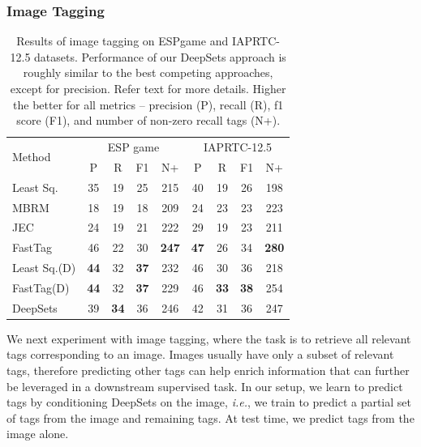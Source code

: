 \documentclass{article}
\newcommand{\latinphrase}[1]{\emph{#1}}    %
\newcommand{\ie}{\latinphrase{i.e.}\xspace}
\newcommand{\deepsets}{DeepSets\xspace}
\begin{document}
\subsubsection{Image Tagging}
\label{sec:image-tag}
\begin{table}
\vspace{-5mm}
    \setlength{\tabcolsep}{4pt}
    \centering
    \scalebox{.75} {
    \begin{tabular}{l | cccc | cccc}
    \toprule
    \multirow{2}{*}{Method} 
    & \multicolumn{4}{c|}{ESP game} 
    & \multicolumn{4}{c}{IAPRTC-12.5}\\
    
    & P & R & F1 & N+
    & P & R & F1 & N+\\
    \midrule
        
     Least Sq. & 35 & 19 & 25 & 215 
        & 40 & 19 & 26 & 198 \\
    
    MBRM & 18 & 19 & 18 & 209
        & 24 & 23 & 23 & 223 \\
        
    JEC & 24 & 19 & 21 & 222 
        & 29 & 19 & 23 & 211 \\
    
    FastTag & 46 & 22 & 30 & \textbf{247}
        & \textbf{47} & 26 & 34 & \textbf{280} \\
    
    Least Sq.(D) & \textbf{44} & 32 & \textbf{37} & 232 
        & 46 & 30 & 36 & 218 \\
    
    FastTag(D) & \textbf{44} & 32 & \textbf{37} & 229
        & 46 & \textbf{33} & \textbf{38} & 254 \\

    \deepsets & 39 & \textbf{34} & 36 & 246
        & 42 & 31 & 36 & 247 \\
    \bottomrule
    \end{tabular}}
    \caption{\small Results of image tagging on ESPgame and IAPRTC-12.5 datasets. Performance of our \deepsets approach is roughly similar to the best competing approaches, except for precision. Refer text for more details. Higher the better for all metrics -- precision (P), recall (R), f1 score (F1), and number of non-zero recall tags (N+).}
    \label{tab:espgame-iaprtc}
\vspace{-5mm}
\end{table}

We next experiment with image tagging, where the task is to retrieve all relevant tags corresponding to an image.
Images usually have only a subset of relevant tags, therefore predicting other tags can help enrich information that can further be leveraged in a downstream supervised task.
In our setup, we learn to predict tags by conditioning \deepsets on the image, \ie, we train to predict a partial set of tags from the image and remaining tags.
At test time, we predict tags from the image alone.
\end{document}
